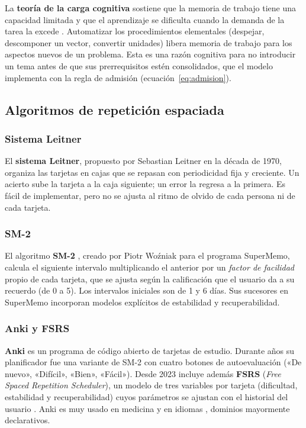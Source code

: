 \documentclass[12pt]{article}
\theoremstyle{definition}
\begin{document}
La \textbf{teoría de la carga cognitiva} sostiene que la memoria de trabajo tiene una capacidad limitada y que el aprendizaje se dificulta cuando la demanda de la tarea la excede \citep{sweller1988}. Automatizar los procedimientos elementales (despejar, descomponer un vector, convertir unidades) libera memoria de trabajo para los aspectos nuevos de un problema. Esta es una razón cognitiva para no introducir un tema antes de que sus prerrequisitos estén consolidados, que el modelo implementa con la regla de admisión (ecuación~\ref{eq:admision}).

\subsection{Algoritmos de repetición espaciada}

\subsubsection{Sistema Leitner}

El \textbf{sistema Leitner}, propuesto por Sebastian Leitner en la década de 1970, organiza las tarjetas en cajas que se repasan con periodicidad fija y creciente. Un acierto sube la tarjeta a la caja siguiente; un error la regresa a la primera. Es fácil de implementar, pero no se ajusta al ritmo de olvido de cada persona ni de cada tarjeta.

\subsubsection{SM-2}

El algoritmo \textbf{SM-2} \citep{wozniak1990}, creado por Piotr Woźniak para el programa SuperMemo, calcula el siguiente intervalo multiplicando el anterior por un \emph{factor de facilidad} propio de cada tarjeta, que se ajusta según la calificación que el usuario da a su recuerdo (de 0 a 5). Los intervalos iniciales son de 1 y 6 días. Sus sucesores en SuperMemo incorporan modelos explícitos de estabilidad y recuperabilidad.

\subsubsection{Anki y FSRS}

\textbf{Anki} es un programa de código abierto de tarjetas de estudio. Durante años su planificador fue una variante de SM-2 con cuatro botones de autoevaluación («De nuevo», «Difícil», «Bien», «Fácil»). Desde 2023 incluye además \textbf{FSRS} (\emph{Free Spaced Repetition Scheduler}), un modelo de tres variables por tarjeta (dificultad, estabilidad y recuperabilidad) cuyos parámetros se ajustan con el historial del usuario \citep{ye2022,su2023}. Anki es muy usado en medicina y en idiomas \citep{gilbert2023,jape2022,hanson2020}, dominios mayormente declarativos.
\end{document}
